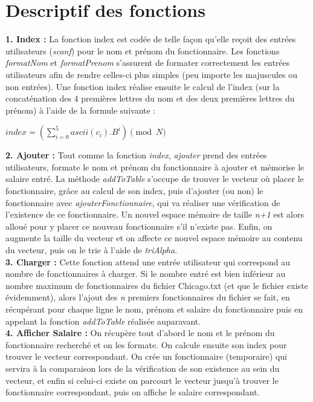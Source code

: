 \chapter*{\textcolor{carmillon}{Descriptif des fonctions}}
\textbf{1. Index :} La fonction index est codée de telle façon qu'elle reçoit des entrées utilisateurs (\textit{scanf}) pour le nom et prénom du fonctionnaire. Les fonctions \textit{formatNom} et \textit{formatPrenom} s'assurent de formater correctement les entrées utilisateurs afin de rendre celles-ci plus simples (peu importe les majuscules ou non entrées). Une fonction index réalise ensuite le calcul de l'index (sur la concaténation des 4 premières lettres du nom et des deux premières lettres du prénom) à l'aide de la formule suivante :
\begin{center}
	\begin{math}
	\boxed{
		index = \left(
		\sum\limits_{i=0}^{5}ascii(c_{i}).B^{i}\right) \pmod N
	}
	\end{math}
\end{center}

\noindent
\textbf{2. Ajouter :} Tout comme la fonction \textit{index}, \textit{ajouter} prend des entrées utilisateurs, formate le nom et prénom du fonctionnaire à ajouter et mémorise le salaire entré. La méthode \textit{addToTable} s'occupe de trouver le vecteur où placer le fonctionnaire, grâce au calcul de son index, puis d'ajouter (ou non) le fonctionnaire avec \textit{ajouterFonctionnaire}, qui va réaliser une vérification de l'existence de ce fonctionnaire. Un nouvel espace mémoire de taille \textit{n+1} est alors alloué pour y placer ce nouveau fonctionnaire s'il n'existe pas. Enfin, on augmente la taille du vecteur et on affecte ce nouvel espace mémoire au contenu du vecteur, puis on le trie à l'aide de \textit{triAlpha}.\\

\noindent
\textbf{3. Charger :} Cette fonction attend une entrée utilisateur qui correspond au nombre de fonctionnaires à charger. Si le nombre entré est bien inférieur au nombre maximum de fonctionnaires du fichier Chicago.txt (et que le fichier existe évidemment), alors l'ajout des \textit{n} premiers fonctionnaires du fichier se fait, en récupérant pour chaque ligne le nom, prénom et salaire du fonctionnaire puis en appelant la fonction \textit{addToTable} réalisée auparavant.\\

\noindent
\textbf{4. Afficher Salaire :} On récupère tout d'abord le nom et le prénom du fonctionnaire recherché et on les formate. On calcule ensuite son index pour trouver le vecteur correspondant. On crée un fonctionnaire (temporaire) qui servira à la comparaison lors de la vérification de son existence au sein du vecteur, et enfin si celui-ci existe on parcourt le vecteur jusqu'à trouver le fonctionnaire correspondant, puis on affiche le salaire correspondant.\\

